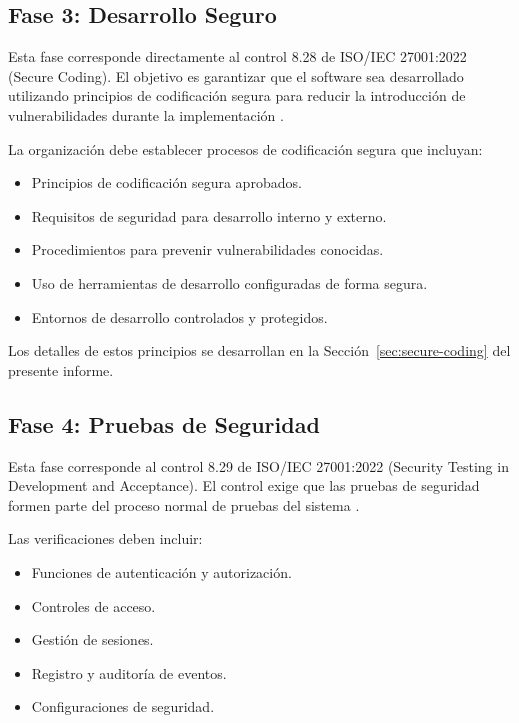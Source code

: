 \subsection{Fase 3: Desarrollo Seguro}

Esta fase corresponde directamente al control 8.28 de ISO/IEC 27001:2022 (Secure Coding). El objetivo es garantizar que el software sea desarrollado utilizando principios de codificación segura para reducir la introducción de vulnerabilidades durante la implementación \cite{nist800218}.

La organización debe establecer procesos de codificación segura que incluyan:

\begin{itemize}
    \item Principios de codificación segura aprobados.
    \item Requisitos de seguridad para desarrollo interno y externo.
    \item Procedimientos para prevenir vulnerabilidades conocidas.
    \item Uso de herramientas de desarrollo configuradas de forma segura.
    \item Entornos de desarrollo controlados y protegidos.
\end{itemize}

Los detalles de estos principios se desarrollan en la Sección~\ref{sec:secure-coding} del presente informe.

\subsection{Fase 4: Pruebas de Seguridad}

Esta fase corresponde al control 8.29 de ISO/IEC 27001:2022 (Security Testing in Development and Acceptance). El control exige que las pruebas de seguridad formen parte del proceso normal de pruebas del sistema \cite{nist800218}.

Las verificaciones deben incluir:

\begin{itemize}
    \item Funciones de autenticación y autorización.
    \item Controles de acceso.
    \item Gestión de sesiones.
    \item Registro y auditoría de eventos.
    \item Configuraciones de seguridad.
\end{itemize}

